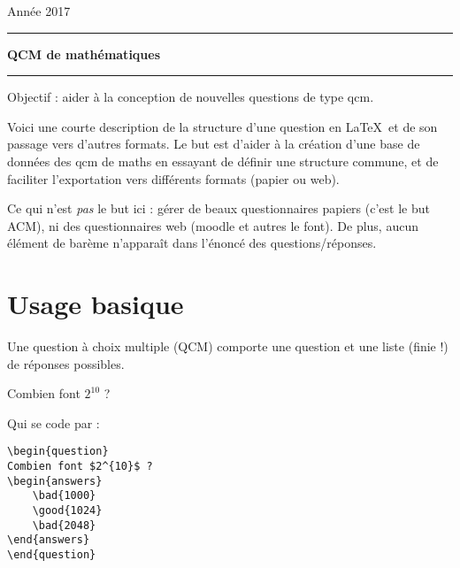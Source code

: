 \documentclass[12pt,a4paper]{article}
\begin{document}
 
 


\hfill\textsf{Ann\'ee 2017}

\vspace*{0.5ex}
\hrule\vspace*{1.5ex} 
\hfil\textsf{\textbf{\Large QCM de mathématiques}}
\vspace*{1ex} \hrule 
\vspace*{5ex} 


Objectif : aider à la conception de nouvelles questions de type qcm.

\bigskip

Voici une courte description de la structure d'une question en \LaTeX\ et de son passage vers d'autres formats. Le but est d'aider à la création d'une base de données des qcm de maths en essayant de définir une structure commune, et de faciliter l'exportation vers différents formats (papier ou web).

\bigskip

Ce qui n'est \emph{pas} le but ici : gérer de beaux questionnaires papiers (c'est le but ACM), ni des questionnaires web (moodle et autres le font). De plus, aucun élément de barème n'apparaît dans l'énoncé des questions/réponses. 



\section{Usage basique}

Une question à choix multiple (QCM) comporte une question et une liste (finie !) de réponses possibles.

\begin{center}
\begin{minipage}{0.8\textwidth}
\begin{question}
Combien font $2^{10}$ ?
\begin{answers}
\end{answers}
\end{question}
\end{minipage}
\end{center}

Qui se code par :
\begin{center}
\begin{minipage}{0.8\textwidth}
\begin{verbatim}
\begin{question}
Combien font $2^{10}$ ?
\begin{answers}
    \bad{1000}
    \good{1024}
    \bad{2048}
\end{answers}
\end{question}
\end{verbatim}
\end{minipage}
\end{center}
\end{document}

